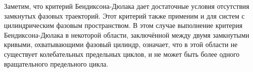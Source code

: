 Заметим, что критерий Бендиксона-Дюлака дает достаточные условия
отсутствия замкнутых фазовых траекторий. Этот критерий также применим и
для систем с цилиндрическим фазовым пространством. В этом случае
выполнение критерия Бендиксона-Дюлака в некоторой области, заключённой
между двумя замкнутыми кривыми, охватывающими фазовый цилиндр,
означает, что в этой области не существует колебательных предельных циклов,
и не может быть более одного вращательного предельного цикла.
